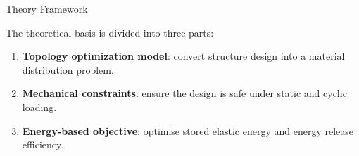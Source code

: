 
\begin{frame}{Theory Framework}
  
      The theoretical basis is divided into three parts:
      \begin{enumerate}
        \item \textbf{Topology optimization model}: convert structure design
            into a material distribution problem.
        \item \textbf{Mechanical constraints}: ensure the design is safe under
            static and cyclic loading.
      \item \textbf{Energy-based objective}: optimise stored elastic energy
            and energy release efficiency.
      \end{enumerate}


\end{frame}


